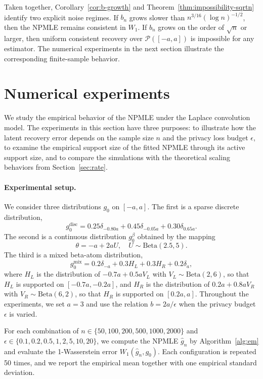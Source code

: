 \documentclass[english, 11pt]{article}
\newcommand{\Beta}{\mathrm{Beta}}
\theoremstyle{plain}
\theoremstyle{definition}
\theoremstyle{remark}
\begin{document}
Taken together, Corollary~\ref{cor:b-growth} and Theorem~\ref{thm:impossibility-sqrtn} identify two explicit noise regimes.
If $b_n$ grows slower than $n^{3/16}(\log n)^{-1/2}$, then the NPMLE remains consistent in $W_1$.
If $b_n$ grows on the order of $\sqrt n$ or larger, then uniform consistent recovery over $\mathcal P([-a,a])$ is impossible for any estimator.
The numerical experiments in the next section illustrate the corresponding finite-sample behavior.

\section{Numerical experiments}\label{sec:exp}

We study the empirical behavior of the NPMLE under the Laplace convolution model.
The experiments in this section have three purposes: to illustrate how the latent recovery error depends on the sample size $n$ and the privacy loss budget $\epsilon$, to examine the empirical support size of the fitted NPMLE through its active support size, and to compare the simulations with the theoretical scaling behaviors from Section~\ref{sec:rate}.

\paragraph{Experimental setup.}We consider three distributions $g_0$ on $[-a,a]$. 
The first is a sparse discrete distribution,
\begin{equation*}
g_0^{\mathrm{disc}}=0.25\delta_{-0.80a}+0.45\delta_{-0.05a}+0.30\delta_{0.65a}.
\end{equation*}
The second is a continuous distribution $g_0^{\beta}$ obtained by the mapping 
\begin{equation*}
\theta=-a+2aU, \quad U\sim\Beta(2.5,5).
\end{equation*}
The third is a mixed beta-atom distribution,
\begin{equation*}
g_0^{\mathrm{mix}}=0.2\delta_{-a}+0.3H_L+0.3 H_R+0.2 \delta_a,
\end{equation*}
where $H_L$ is the distribution of $-0.7a + 0.5a V_L$ with $V_L\sim\Beta(2,6)$, so that $H_L$ is supported on $[-0.7a,-0.2a]$, and $H_R$ is the distribution of $0.2a + 0.8a V_R$ with $V_R\sim\Beta(6,2)$, so that $H_R$ is supported on $[0.2a,a]$.
Throughout the experiments, we set $a=3$ and use the relation $b=2a/\epsilon$ when the privacy budget $\epsilon$ is varied.

For each combination of $n\in\{50,100,200,500,1000,2000\}$ and $\epsilon\in\{0.1,0.2,0.5,1, 2,\allowbreak 5, 10, 20\}$, we compute the NPMLE $\widehat g_n$ by Algorithm~\ref{alg:em} and evaluate the 1-Wasserstein error $W_1(\widehat g_n,g_0)$. 
Each configuration is repeated 50 times, and we report the empirical mean together with one empirical standard deviation.
\end{document}
